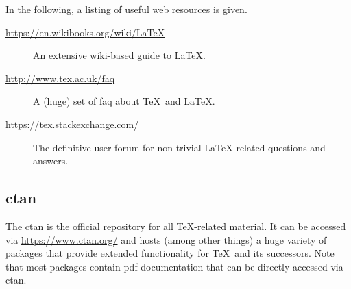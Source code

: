 In the following, a listing of useful web resources is given.
\begin{description}
\item[\url{https://en.wikibooks.org/wiki/LaTeX}] An extensive wiki-based guide to \LaTeX.
\item[\url{http://www.tex.ac.uk/faq}] A (huge) set of \gls{faq} about \TeX\ and \LaTeX.
\item[\url{https://tex.stackexchange.com/}] The definitive user forum for non-trivial \LaTeX-related questions and answers.
\end{description}

\subsection[Comprehensive TeX Archive Network]{\gls{ctan}}

The \gls{ctan} is the official repository for all \TeX-related material.
It can be accessed via \url{https://www.ctan.org/} and hosts (among other things) a huge variety of packages that provide extended functionality for \TeX\ and its successors.
Note that most packages contain \gls{pdf} documentation that can be directly accessed via \gls{ctan}.

